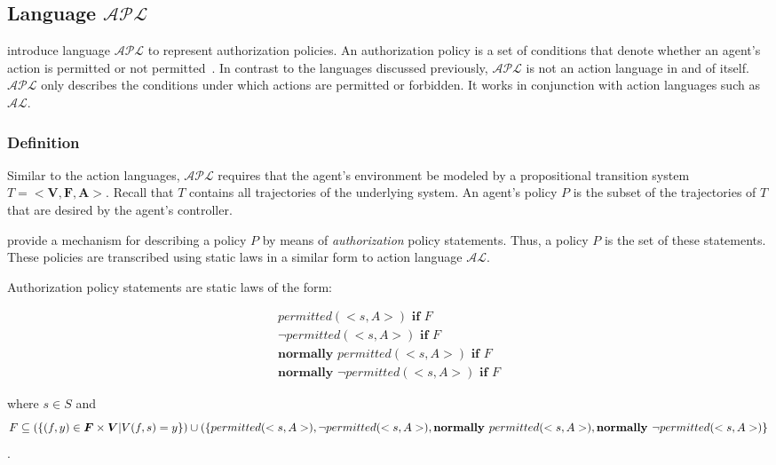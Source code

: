 \subsection{Language $\mathcal{APL}$}

\citet{gelfond_authorization_2008} introduce language $\mathcal{APL}$ to represent authorization policies.
An authorization policy is a set of conditions that denote whether an agent's action is permitted or not permitted~\citep{gelfond_authorization_2008}.
In contrast to the languages discussed previously, $\mathcal{APL}$ is not an action language in and of itself.
$\mathcal{APL}$ only describes the conditions under which actions are permitted or forbidden.
It works in conjunction with action languages such as $\mathcal{AL}$.

\subsubsection{Definition}

Similar to the action languages, $\mathcal{APL}$ requires that the agent's environment be modeled by a propositional transition system $T=<\boldsymbol{V},\boldsymbol{F},\boldsymbol{A}>$.
Recall that $T$ contains all trajectories of the underlying system.
An agent's policy $P$ is the subset of the trajectories of $T$ that are desired by the agent's controller.

\citet{gelfond_authorization_2008} provide a mechanism for describing a policy $P$ by means of \textit{authorization} policy statements.
Thus, a policy $P$ is the set of these statements.
These policies are transcribed using static laws in a similar form to action language $\mathcal{AL}$.

\begin{definition}
    Authorization policy statements are static laws of the form:

    \begin{gather*}
        permitted\left(<s,A>\right) \textbf{ if } F \\
        \neg permitted\left(<s,A>\right) \textbf{ if } F \\
        \textbf{normally } permitted(<s,A>) \textbf{ if } F \\
        \textbf{normally } \neg permitted(<s,A>) \textbf{ if } F
    \end{gather*}

    \noindent
    where
    $s \in S$
    and
    \[
        F\subseteq\left(\{(f, y) \in \boldsymbol{F} \times \boldsymbol{V} | V(f,s)=y\}\right) \cup (\{permitted(<s,A>), \\
        \neg permitted(<s, A>), \\
        \textbf{normally } permitted(<s,A>), \\
        \textbf{normally } \neg permitted(<s,A>)\}
    \].
\end{definition}

